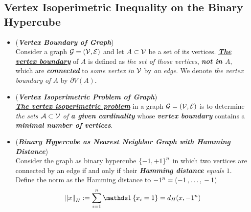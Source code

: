 \documentclass[11pt]{article}
\begin{document}
\subsection{Vertex Isoperimetric Inequality on the Binary Hypercube}
\begin{itemize}
\item \begin{definition} (\emph{\textbf{Vertex Boundary of Graph}}) \citep{boucheron2013concentration}\\
Consider a graph ${\mathcal G} = ({\mathcal V}, {\mathcal E})$ and let $A \subset {\mathcal V}$ be a set of its vertices. \underline{\emph{\textbf{The vertex boundary}}} of $A$ is defined as \emph{the set of those vertices}, \emph{\textbf{not in $A$}}, which are \emph{\textbf{connected}} to \emph{some vertex in ${\mathcal V}$} by \emph{an edge}. We denote \emph{the vertex boundary of $A$} by $\partial V(A)$.
\end{definition}

\item \begin{definition} (\emph{\textbf{Vertex Isoperimetric Problem of Graph}}) \citep{boucheron2013concentration}\\
\underline{\emph{\textbf{The vertex isoperimetric problem}}} in a graph ${\mathcal G} = ({\mathcal V}, {\mathcal E})$ is to determine \emph{the sets ${\mathcal A} \subset {\mathcal V}$ of \textbf{a given cardinality}} whose \emph{\textbf{vertex boundary}} contains a \emph{\textbf{minimal number of vertices}}. 
\end{definition}

\item \begin{remark} (\textbf{\emph{Binary Hypercube as Nearest Neighbor Graph with Hamming Distance}}) \\
Consider the graph as binary hypercube $\left\{-1, +1\right\}^n$ in which two vertices are connected by an edge if and only if their \emph{\textbf{Hamming distance} equals $1$}.  Define the norm as the Hamming distance to $-1^n= (-1 \,{,}\ldots{,}\, -1)$
\begin{align*}
\norm{x}{H} := \sum_{i=1}^{n}\ind{x_i = 1} = d_{H}(x, -1^n)
\end{align*}
\end{remark}


\end{itemize}
\end{document}
